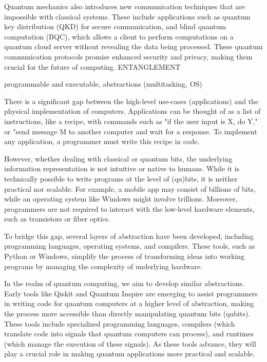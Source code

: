 Quantum mechanics also introduces new communication techniques that are impossible with classical systems.
These include applications such as quantum key distribution (QKD) for secure communication, and blind quantum computation (BQC), which allows a client to perform computations on a quantum cloud server without revealing the data being processed.
These quantum communication protocols promise enhanced security and privacy, making them crucial for the future of computing.
ENTANGLEMENT


programmable and executable, abstractions (multitasking, OS)

There is a significant gap between the high-level use-cases (applications) and the physical implementation of computers.
Applications can be thought of as a list of instructions, like a recipe, with commands such as "if the user input is X, do Y," or "send message M to another computer and wait for a response.
To implement any application, a programmer must write this recipe in code.

However, whether dealing with classical or quantum bits, the underlying information representation is not intuitive or native to humans.
While it is technically possible to write programs at the level of (qu)bits, it is neither practical nor scalable.
For example, a mobile app may consist of billions of bits, while an operating system like Windows might involve trillions.
Moreover, programmers are not required to interact with the low-level hardware elements, such as transistors or fiber optics.

To bridge this gap, several layers of abstraction have been developed, including programming languages, operating systems, and compilers.
These tools, such as Python or Windows, simplify the process of transforming ideas into working programs by managing the complexity of underlying hardware.

In the realm of quantum computing, we aim to develop similar abstractions.
Early tools like Qiskit and Quantum Inspire are emerging to assist programmers in writing code for quantum computers at a higher level of abstraction, making the process more accessible than directly manipulating quantum bits (qubits).
These tools include specialized programming languages, compilers (which translate code into signals that quantum computers can process), and runtimes (which manage the execution of these signals).
As these tools advance, they will play a crucial role in making quantum applications more practical and scalable.

